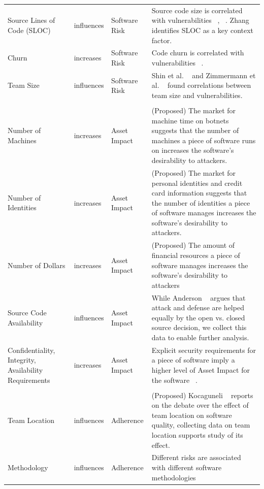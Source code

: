 \begin{table}[!htbp]
\begin{small}
\begin{tabular}{@{\extracolsep{5pt}}p{4cm}p{1cm}p{2cm}p{8cm}}
			Source Lines of Code (SLOC)	& influences	& Software Risk & Source code size is correlated with vulnerabilities ~\cite{shin2011evaluating}, ~\cite{alhazmi2007measuring}. Zhang~\cite{zhang2014towards} identifies SLOC as a key context factor. \\
			Churn &	increases &	Software Risk  &  Code churn is correlated with vulnerabilities ~\cite{shin2011evaluating}.\\
			Team Size	& influences	& Software Risk & Shin et al. ~\cite{shin2011evaluating} and Zimmermann et al. ~\cite{zimmerman2010searching} found correlations between team size and vulnerabilities. \\			
			\hline \\[-1.8ex] 
			Number of Machines &	increases &	Asset Impact & (Proposed) The market for machine time on botnets suggests that the number of machines a piece of software runs on increases the software's desirability to attackers. \\
			Number of Identities &	increases &	Asset Impact	 &  (Proposed) The market for personal identities and credit card information suggests that the number of identities a piece of software manages increases the software's desirability to attackers.\\
			Number of Dollars &	increases &	Asset Impact	 & (Proposed) The amount of financial resources a piece of software manages increases the software's desirability to attackers\\
			Source Code Availability	& influences &	Asset Impact & While Anderson ~\cite{anderson2002security} argues that attack and defense
			are helped equally by the open vs. closed source decision, we collect this data to enable further analysis.  \\
			Confidentiality, Integrity, Availability Requirements &	increases &	Asset Impact	& Explicit security requirements for a piece of software imply a higher level of Asset Impact for the software ~\cite{mell2007complete}. \\
			\hline \\[-1.8ex]
			Team Location &	influences &	Adherence	& (Proposed)  Kocaguneli ~\cite{kocaguneli2013distributed} reports on the debate over the effect of team location on software quality, collecting data on team location supports study of its effect. \\
			Methodology	& influences &	Adherence	& Different risks are associated with different software methodologies~\cite{williams2004xpef,jones2000software} \\

\end{tabular}
\end{small}
\end{table}
